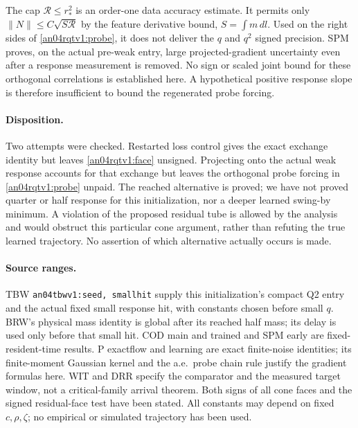 \documentclass[11pt]{article}
\begin{document}
The cap $\mathcal R\le r_*^2$ is an order-one data accuracy
estimate. It permits only
$\|N\|\le C\sqrt{S\mathcal R}$ by the feature derivative bound,
$S=\int m\,dl$. Used on the right sides of \eqref{an04rqtv1:probe},
it does not deliver the $q$ and $q^2$ signed precision. SPM proves,
on the actual pre-weak entry, large projected-gradient uncertainty
even after a response measurement is removed. No sign or scaled
joint bound for these orthogonal correlations is established here.
A hypothetical positive response slope is therefore insufficient
to bound the regenerated probe forcing.

\paragraph{Disposition.}
Two attempts were checked. Restarted loss control gives the exact
exchange identity but leaves \eqref{an04rqtv1:face} unsigned.
Projecting onto the actual weak response accounts for that
exchange but leaves the orthogonal probe forcing in
\eqref{an04rqtv1:probe} unpaid. The reached alternative is proved;
we have not proved quarter or half response for this initialization,
nor a deeper learned swing-by minimum. A violation of the proposed
residual tube is allowed by the analysis and would obstruct this
particular cone argument, rather than refuting the true learned
trajectory. No assertion of which alternative actually occurs is made.

\paragraph{Source ranges.}
TBW \texttt{an04tbwv1:seed, smallhit} supply this initialization's
compact Q2 entry and the actual fixed small response hit, with
constants chosen before small $q$. BRW's physical mass identity
is global after its reached half mass; its delay is used only
before that small hit. COD main and trained and SPM early are
fixed-resident-time results. P exactflow and learning are exact
finite-noise identities; its finite-moment Gaussian kernel and
the a.e.\ probe chain rule justify the gradient formulas here.
WIT and DRR specify the comparator and the measured target window,
not a critical-family arrival theorem. Both signs of all cone faces
and the signed residual-face test have been stated. All constants
may depend on fixed $c,\rho,\zeta$; no empirical or simulated
trajectory has been used.
\end{document}
